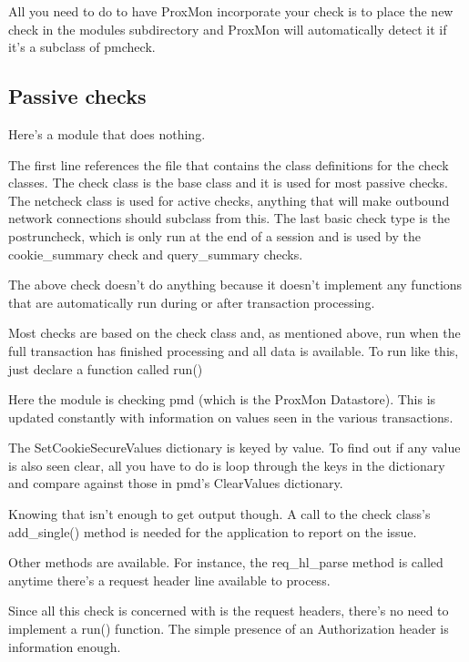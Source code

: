 \documentclass{article}
\begin{document}
All you need to do to have ProxMon incorporate your check is to place the
new check in the modules subdirectory and ProxMon will automatically detect it if 
it's a subclass of pmcheck.

\subsection{Passive checks}
Here's a module that does nothing.


The first line references the file that contains the class definitions for the
check classes.  The check class is the base class and it is used for most passive
checks.  The netcheck class is used for active checks, anything that will make 
outbound network connections should subclass from this.  The last basic check 
type is the postruncheck, which is only run at the end of a session and is used
by the cookie\_summary check and query\_summary checks.

The above check doesn't do anything because it doesn't implement any functions
that are automatically run during or after transaction processing.

Most checks are based on the check class and, as mentioned above, run when the 
full transaction has finished processing and all data is available.  To run like 
this, just declare a function called run()


Here the module is checking pmd (which is the ProxMon Datastore).  This is
updated constantly with information on values seen in the various transactions.

The SetCookieSecureValues dictionary is keyed by value.  To find out if any
value is also seen clear, all you have to do is loop through the keys in
the dictionary and compare against those in pmd's ClearValues dictionary.

Knowing that isn't enough to get output though.  A call to the check class's
add\_single() method is needed for the application to report on the issue.

Other methods are available.  For instance, the req\_hl\_parse method is
called anytime there's a request header line available to process.


Since all this check is concerned with is the request headers, there's no need
to implement a run() function.  The simple presence of an Authorization header
is information enough.
\end{document}
